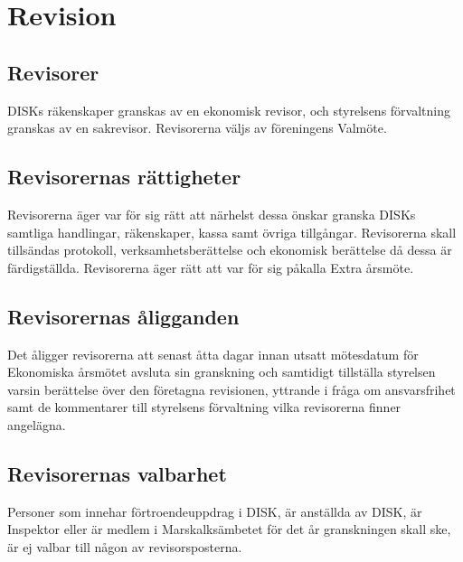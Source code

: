 \clearpage


\section{Revision}
\label{sec:revision}

        \subsection{Revisorer}
        \label{subsec:revisorer}
                DISKs räkenskaper granskas av en ekonomisk revisor, och styrelsens förvaltning granskas av en sakrevisor. Revisorerna väljs av föreningens Valmöte.

        \subsection{Revisorernas rättigheter}
        \label{subsec:revisornsrattigheter}
                Revisorerna äger var för sig rätt att närhelst dessa önskar granska DISKs samtliga handlingar, räkenskaper, kassa samt övriga tillgångar. Revisorerna skall tillsändas protokoll, verksamhetsberättelse och ekonomisk berättelse då dessa är färdigställda. Revisorerna äger rätt att var för sig påkalla Extra årsmöte.

        \subsection{Revisorernas åligganden}
        \label{subsec:revisornsaligganden}
                Det åligger revisorerna att senast åtta dagar innan utsatt mötesdatum för Ekonomiska årsmötet avsluta sin granskning och samtidigt tillställa styrelsen varsin berättelse över den företagna revisionen, yttrande i fråga om ansvarsfrihet samt de kommentarer till styrelsens förvaltning vilka revisorerna finner angelägna.

        \subsection{Revisorernas valbarhet}
        \label{subsec:revisorsvalbarhet}
        Personer som innehar förtroendeuppdrag i DISK, är anställda av DISK, är Inspektor eller är medlem i Marskalksämbetet för det år granskningen skall ske, är ej valbar till någon av revisorsposterna.
